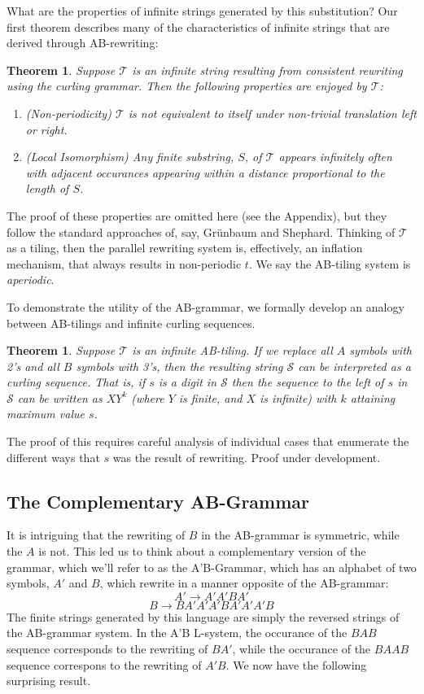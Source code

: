 \documentclass[11pt]{article}
\def\emph#1{{\em #1\/}}
\def\term#1{\emph{#1}}
\newcounter{thm}
\newtheorem{theorem}[thm]{Theorem}
\def\ni{\noindent}
\begin{document}
What are the properties of infinite strings generated by this substitution?  Our first theorem describes many of the characteristics of infinite strings that are derived through AB-rewriting:
\def\scS{\mathcal{S}}
\def\scT{\mathcal{T}}
\begin{theorem}\label{thm:aperiodic}
Suppose $\scT$ is an infinite string resulting from 
consistent rewriting using the curling grammar.  Then the following properties are enjoyed by $\scT$:
\begin{enumerate}
\item (Non-periodicity) $\scT$ is not equivalent to itself under
non-trivial translation left or right.
\item (Local Isomorphism) Any finite substring, $S$, of $\scT$ appears
infinitely often with adjacent occurances appearing within a distance proportional to the length of $S$.
\end{enumerate}
\end{theorem}
\ni The proof of these properties are omitted here (see the Appendix), but they
follow the standard approaches of, say, Gr\"unbaum and Shephard\cite{Gr87}.
Thinking of $\scT$ as a tiling, then the parallel rewriting system is,
effectively, an inflation mechanism, that always results in non-periodic $t$.  We say the AB-tiling system is \term{aperiodic}.

To demonstrate the utility of the AB-grammar, we formally develop an analogy
between AB-tilings and infinite curling sequences.

\begin{theorem}
Suppose $\scT$ is an infinite AB-tiling.  If we replace all $A$ symbols with
2's and all $B$ symbols with 3's, then the resulting string $\scS$ can be
interpreted as a curling sequence.  That is, if $s$ is a digit
in $\scS$ then the sequence to the left of $s$ in $\scS$ can be written as
$XY^k$ (where $Y$ is finite, and $X$ is infinite) with $k$ attaining maximum
value $s$.
\end{theorem}
\ni The proof of this requires careful analysis of individual cases that
enumerate the different ways that $s$ was the result of rewriting. 
Proof under development.

\subsection{The Complementary AB-Grammar}
It is intriguing that the rewriting of $B$ in the AB-grammar is symmetric,
while the $A$ is not.  This led us to think about a complementary version of
the grammar, which we'll refer to as the A'B-Grammar, which has an alphabet of two
symbols, $A'$ and $B$, which rewrite in a manner opposite of the AB-grammar:
$$A'\rightarrow A' A' B A'$$
$$B\rightarrow B A' A' A' B A' A' A' B$$
\ni The finite strings generated by this language are simply the reversed
strings of the AB-grammar system.  In the A'B L-system, the occurance of the
$BAB$ sequence corresponds to the rewriting of $BA'$, while the occurance of
the $BAAB$ sequence correspons to the rewriting of $A'B$. We now have the
following surprising result.
\end{document}
